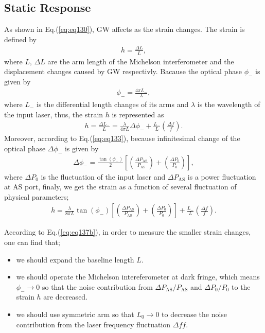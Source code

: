 \subsection{Static Response} \label{sec:sec122}
As shown in Eq.(\ref{eq:eq130}), GW affects as the strain changes. The strain is defined by
\begin{eqnarray}
  h = \frac{\Delta{L}}{L}, \label{eq:eq134a}
\end{eqnarray}
where $L,\,\Delta{L}$ are the arm length of the Michelson interferometer and the displacement changes caused by GW respectivly. Bacause the optical phase $\phi_{-}$ is given by
\begin{eqnarray}
  \phi_{-}=\frac{4\pi{L_{-}}}{\lambda},
\end{eqnarray}
where $L_{-}$ is the differential length changes of its arms and $\lambda$ is the wavelength of the input laser, thus, the strain $h$ is represented as 
\begin{eqnarray}
  h = \frac{\Delta{L_{-}}}{L} = \frac{\lambda}{4\pi{L}}\Delta{\phi_{-}} + \frac{L_{-}}{L}\left(\frac{\Delta{f}}{f}\right). \label{eq:eq133_a}
\end{eqnarray}
Moreover, according to Eq.(\ref{eq:eq133}), because infinitesimal change of the optical phase $\Delta{\phi_{-}}$ is given by 
\begin{eqnarray}
  \Delta{\phi_{-}} = \frac{\tan{(\phi_{-})}}{2} \left[\left(\frac{\Delta P_{\mathrm{AS}}}{P_{\mathrm{AS}}}\right) + \left(\frac{\Delta{P_0}}{P_0}\right) \right],
\end{eqnarray}
where $\Delta{P_0}$ is the fluctuation of the input laser and $\Delta{P_{\mathrm{AS}}}$ is a power fluctuation at AS port, finaly, we get the strain as a function of several fluctuation of physical parameters;
\begin{eqnarray}
  h = \frac{\lambda}{8\pi{L}}\tan{(\phi_{-})} \left[\left(\frac{\Delta P_{\mathrm{AS}}}{P_{\mathrm{AS}}}\right) + \left(\frac{\Delta{P_0}}{P_0}\right) \right] + \frac{L_{-}}{L}\left(\frac{\Delta{f}}{f}\right). \label{eq:eq137b}
\end{eqnarray}

According to Eq.(\ref{eq:eq137b}), in order to measure the smaller strain changes, one can find that;
\begin{itemize}
  \setlength{\itemsep}{1pt}      %
  \setlength{\parskip}{-1pt}     %
  \setlength{\itemindent}{0pt}   %
  \setlength{\labelsep}{5pt}     %
\item we should expand the baseline length $L$.
\item we should operate the Michelson intereferometer at dark fringe, which means $\phi_{-}\to0$ so that the noise contribution from $\Delta P_{\mathrm{AS}}/P_{\mathrm{AS}}$ and $\Delta{P_0}/P_0$ to the strain $h$ are decreased.
\item we should use symmetric arm so that $L_{0}\to0$ to decrease the noise contribution from the laser frequency fluctuation $\Delta{f}{f}$.
\end{itemize}



